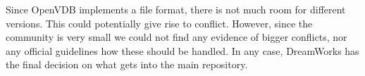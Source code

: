 Since OpenVDB implements a file format, there is not much room for different versions. This could potentially give rise to conflict. However, since the community is very small we could not find any evidence of bigger conflicts, nor any official guidelines how these should be handled. In any case, DreamWorks has the final decision on what gets into the main repository.


